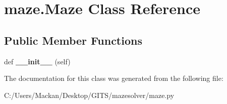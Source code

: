 \hypertarget{classmaze_1_1_maze}{}\section{maze.\+Maze Class Reference}
\label{classmaze_1_1_maze}
\subsection*{Public Member Functions}
\begin{DoxyCompactItemize}
\item 
\mbox{\label{classmaze_1_1_maze_adde47755d528247311d6223ea983d365}} 
def {\bfseries \+\_\+\+\_\+init\+\_\+\+\_\+} (self)
\end{DoxyCompactItemize}


The documentation for this class was generated from the following file\+:\begin{DoxyCompactItemize}
\item 
C\+:/\+Users/\+Mackan/\+Desktop/\+G\+I\+T\+S/mazesolver/maze.\+py\end{DoxyCompactItemize}
